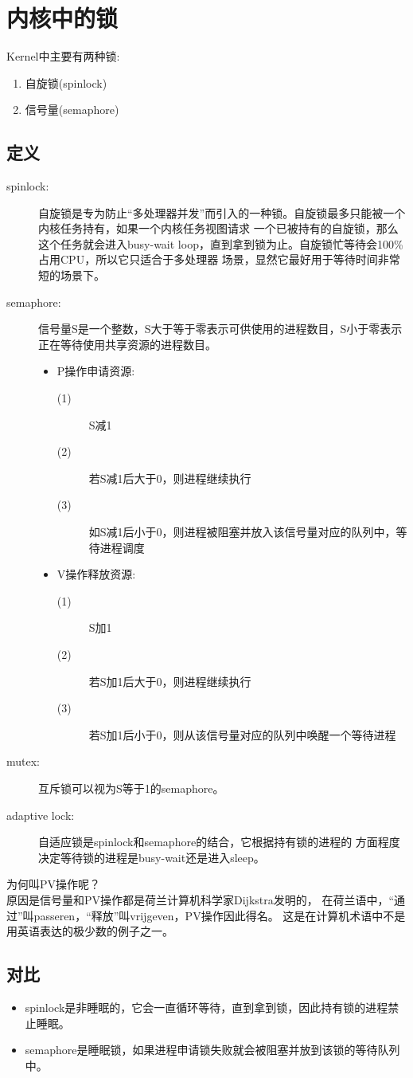 ﻿\section[locks in kernel]{内核中的锁}
Kernel中主要有两种锁:
\begin{enumerate}
  \item 自旋锁(spinlock)
  \item 信号量(semaphore)
\end{enumerate}

\subsection[定义]{定义}
\begin{description}
  \item[spinlock: ] 自旋锁是专为防止“多处理器并发”而引入的一种锁。自旋锁最多只能被一个内核任务持有，如果一个内核任务视图请求
  一个已被持有的自旋锁，那么这个任务就会进入busy-wait loop，直到拿到锁为止。自旋锁忙等待会100\%占用CPU，所以它只适合于多处理器
  场景，显然它最好用于等待时间非常短的场景下。
  \item[semaphore: ] 信号量S是一个整数，S大于等于零表示可供使用的进程数目，S小于零表示正在等待使用共享资源的进程数目。
  \begin{itemize}
    \item P操作申请资源:
    \begin{description}
      \item[(1)] S减1
      \item[(2)] 若S减1后大于0，则进程继续执行
      \item[(3)] 如S减1后小于0，则进程被阻塞并放入该信号量对应的队列中，等待进程调度
    \end{description}
    \item V操作释放资源:
    \begin{description}
      \item[(1)] S加1
      \item[(2)] 若S加1后大于0，则进程继续执行
      \item[(3)] 若S加1后小于0，则从该信号量对应的队列中唤醒一个等待进程
    \end{description}
  \end{itemize}
  \item[mutex: ] 互斥锁可以视为S等于1的semaphore。
  \item[adaptive lock: ] 自适应锁是spinlock和semaphore的结合，它根据持有锁的进程的
  方面程度决定等待锁的进程是busy-wait还是进入sleep。
\end{description}
为何叫PV操作呢？\\
原因是信号量和PV操作都是荷兰计算机科学家Dijkstra发明的，
在荷兰语中，“通过”叫passeren，“释放”叫vrijgeven，PV操作因此得名。
这是在计算机术语中不是用英语表达的极少数的例子之一。

\subsection[对比]{对比}
\begin{itemize}
  \item spinlock是非睡眠的，它会一直循环等待，直到拿到锁，因此持有锁的进程禁止睡眠。
  \item semaphore是睡眠锁，如果进程申请锁失败就会被阻塞并放到该锁的等待队列中。
\end{itemize}

